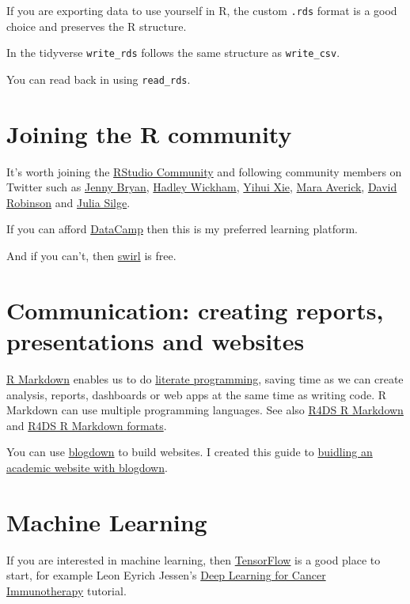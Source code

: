 \documentclass[12pt,]{book}
\theoremstyle{definition}
\theoremstyle{definition}
\theoremstyle{definition}
\theoremstyle{remark}
\begin{document}
If you are exporting data to use yourself in R, the custom \texttt{.rds}
format is a good choice and preserves the R structure.

In the tidyverse \texttt{write\_rds} follows the same structure as
\texttt{write\_csv}.

You can read back in using \texttt{read\_rds}.

\section{Joining the R community}\label{joining-the-r-community}

It's worth joining the \href{https://community.rstudio.com/}{RStudio
Community} and following community members on Twitter such as
\href{https://twitter.com/JennyBryan}{Jenny Bryan},
\href{https://twitter.com/hadleywickham}{Hadley Wickham},
\href{https://twitter.com/xieyihui}{Yihui Xie},
\href{https://twitter.com/dataandme}{Mara Averick},
\href{https://twitter.com/drob}{David Robinson} and
\href{https://twitter.com/juliasilge}{Julia Silge}.

If you can afford \href{https://www.datacamp.com}{DataCamp} then this is
my preferred learning platform.

And if you can't, then \href{https://swirlstats.com/}{swirl} is free.

\section{Communication: creating reports, presentations and
websites}\label{communication-creating-reports-presentations-and-websites}

\href{https://rmarkdown.rstudio.com/lesson-1.html}{R Markdown} enables
us to do
\href{https://en.wikipedia.org/wiki/Literate_programming}{literate
programming}, saving time as we can create analysis, reports, dashboards
or web apps at the same time as writing code. R Markdown can use
multiple programming languages. See also
\href{http://r4ds.had.co.nz/r-markdown.html}{R4DS R Markdown} and
\href{http://r4ds.had.co.nz/r-markdown-formats.html}{R4DS R Markdown
formats}.

You can use \href{https://bookdown.org/yihui/blogdown/}{blogdown} to
build websites. I created this guide to
\href{http://ab604.github.io/docs/website_bookdown/}{buidling an
academic website with blogdown}.

\section{Machine Learning}\label{machine-learning}

If you are interested in machine learning, then
\href{https://tensorflow.rstudio.com/}{TensorFlow} is a good place to
start, for example Leon Eyrich Jessen's
\href{https://tensorflow.rstudio.com/blog/dl-for-cancer-immunotherapy.html}{Deep
Learning for Cancer Immunotherapy} tutorial.


\end{document}
